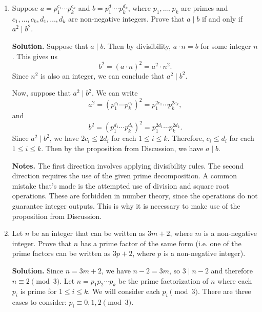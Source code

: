 \documentclass[11pt]{article}
\begin{document}
\begin{enumerate}[leftmargin=*]
  \textbf{Notes.}
  \begin{itemize}
    \item Here, it's necessary to use strong induction since we require knowledge of the composition of integers beyond just $k$ in order to guarantee that our composition for $k+1$ involves distinct powers of two.
    \item What this result is really about is the binary representation of integers. Since each power of two is involved at most once, this corresponds to a bit being either 0 or 1.
  \end{itemize}

  \item Suppose $a = p_1^{c_1} \cdots p_k^{c_k}$ and $b = p_1^{d_1} \cdots p_k^{d_k}$, where $p_1, \ldots, p_k$ are primes and $c_1, \ldots, c_k, d_1, \ldots, d_k$ are non-negative integers. Prove that $a \mid b$ if and only if $a^2 \mid b^2$.

  \textbf{Solution.} Suppose that $a \mid b$. Then by divisibility, $a \cdot n = b$ for some integer $n$. This gives us
  \[
    b^2 = (a \cdot n)^2 = a^2 \cdot n^2.
  \]
  Since $n^2$ is also an integer, we can conclude that $a^2 \mid b^2$.

  Now, suppose that $a^2 \mid b^2$. We can write
  \[
    a^2 = \left(p_1^{c_1} \cdots p_k^{c_k}\right)^2 = p_1^{2c_1} \cdots p_k^{2c_k},
  \]
  and
  \[
    b^2 = \left(p_1^{d_1} \cdots p_k^{d_k}\right)^2 = p_1^{2d_1} \cdots p_k^{2d_k}.
  \]
  Since $a^2 \mid b^2$, we have $2c_i \le 2d_i$ for each $1 \le i \le k$. Therefore, $c_i \le d_i$ for each $1 \le i \le k$. Then by the proposition from Discussion, we have $a \mid b$.

  \textbf{Notes.} The first direction involves applying divisibility rules. The second direction requires the use of the given prime decomposition. A common mistake that's made is the attempted use of division and square root operations. These are forbidden in number theory, since the operations do not guarantee integer outputs. This is why it is necessary to make use of the proposition from Discussion.

  \item Let $n$ be an integer that can be written as $3m+2$, where $m$ is a non-negative integer. Prove that $n$ has a prime factor of the same form (i.e. one of the prime factors can be written as $3p+2$, where $p$ is a non-negative integer).

  \textbf{Solution.} Since $n = 3m+2$, we have $n-2 = 3m$, so $3 \mid n-2$ and therefore $n \equiv 2 \pmod 3$. Let $n = p_1p_2 \cdots p_k$ be the prime factorization of $n$ where each $p_i$ is prime for $1 \le i \le k$. We will consider each $p_i \pmod 3$. There are three cases to consider: $p_i \equiv 0, 1, 2 \pmod 3$.


\end{enumerate}
\end{document}
